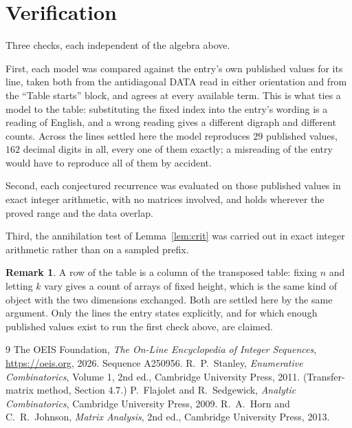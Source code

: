\documentclass[11pt,a4paper]{article}
\theoremstyle{plain}
\theoremstyle{definition}
\newtheorem{remark}[theorem]{Remark}
\begin{document}
\section{Verification}

Three checks, each independent of the algebra above.

First, each model was compared against the entry's own published values for its line, taken
both from the antidiagonal DATA read in either orientation and from the ``Table starts''
block, and agrees at every available term. This is what ties a model to the table:
substituting the fixed index into the entry's wording is a reading of English, and a wrong
reading gives a different digraph and different counts. Across the lines settled here the
model reproduces $29$ published values, $162$ decimal digits in all, every one of
them exactly; a misreading of the entry would have to reproduce all of them by accident.

Second, each conjectured recurrence was evaluated on those published values in exact
integer arithmetic, with no matrices involved, and holds wherever the proved range and the
data overlap.

Third, the annihilation test of Lemma~\ref{lem:crit} was carried out in exact integer
arithmetic rather than on a sampled prefix.

\begin{remark}
A row of the table is a column of the transposed table: fixing $n$ and letting $k$ vary gives a
count of arrays of fixed height, which is the same kind of object with the two dimensions
exchanged. Both are settled here by the same argument. Only the lines the entry states
explicitly, and for which enough published values exist to run the first check above, are
claimed.
\end{remark}

\begin{thebibliography}{9}
 The OEIS Foundation, \emph{The On-Line Encyclopedia of Integer
Sequences}, \url{https://oeis.org}, 2026. Sequence A250956.
 R.~P.~Stanley, \emph{Enumerative Combinatorics}, Volume 1, 2nd ed.,
Cambridge University Press, 2011. (Transfer-matrix method, Section 4.7.)
 P.~Flajolet and R.~Sedgewick, \emph{Analytic Combinatorics}, Cambridge
University Press, 2009.
 R.~A.~Horn and C.~R.~Johnson, \emph{Matrix Analysis}, 2nd ed., Cambridge
University Press, 2013.
\end{thebibliography}
\end{document}
